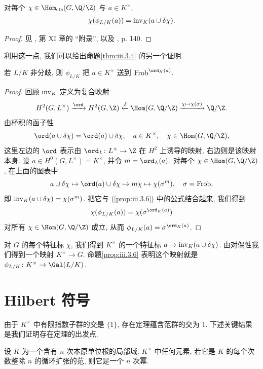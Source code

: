 \begin{proposition}\label{prop:iii.3.6}
对每个 $\chi\in\Hom_{\mathrm{cts}}(G,\Q/\Z)$ 与 $a\in K^\times$,
\[
 \chi(\phi_{L/K}(a))=\operatorname{inv}_K(a\cup\delta\chi).
\]
\end{proposition}

\begin{proof}
见 \cite{Serre1962}, 第 XI 章的 ``附录'', 以及 \cite{Serre1967a}, p. 140.
\end{proof}

利用这一点, 我们可以给出命题\ref{thm:iii.3.4} 的另一个证明.

\begin{lemma}\label{lem:iii.3.7}
若 $L/K$ 非分歧, 则 $\phi_{L/K}$ 把 $a\in K^\times$ 送到 $\Frob^{\ord_K(a)}$.
\end{lemma}

\begin{proof}
回顾 $\operatorname{inv}_K$ 定义为复合映射
\[
 H^2(G,L^\times)\xrightarrow{\ord}H^2(G,\Z)\xleftarrow{\delta}\Hom(G,\Q/\Z)\xrightarrow{\chi\mapsto\chi(\sigma)}\Q/\Z.
\]
由杯积的函子性
\[
 \ord(a\cup\delta\chi)=\ord(a)\cup\delta\chi,\quad a\in K^\times,\quad \chi\in\Hom(G,\Q/\Z),
\]
这里左边的 $\ord$ 表示由 $\ord_L\colon L^\times\to\Z$ 在 $H^2$ 上诱导的映射, 右边则是该映射本身. 设 $a\in H^0(G,L^\times)=K^\times$, 并令 $m=\ord_L(a)$. 对每个 $\chi\in\Hom(G,\Q/\Z)$, 在上面的图表中
\[
 a\cup\delta\chi\mapsto\ord(a)\cup\delta\chi\mapsto m\chi\mapsto\chi(\sigma^m),\quad \sigma=\Frob,
\]
即 $\operatorname{inv}_K(a\cup\delta\chi)=\chi(\sigma^m)$. 把它与 (\ref{prop:iii.3.6}) 中的公式结合起来, 我们得到
\[
 \chi(\phi_{L/K}(a))=\chi(\sigma^{\ord_K(a)})
\]
对所有 $\chi\in\Hom(G,\Q/\Z)$ 成立, 从而 $\phi_{L/K}(a)=\sigma^{\ord_K(a)}$.
\end{proof}

对 $G$ 的每个特征标 $\chi$, 我们得到 $K^\times$ 的一个特征标 $a\mapsto\operatorname{inv}_K(a\cup\delta\chi)$. 由对偶性我们得到一个映射 $K^\times\to G$. 命题\ref{prop:iii.3.6} 表明这个映射就是 $\phi_{L/K}\colon K^\times\to\Gal(L/K)$.

\section{Hilbert 符号}\label{sec:III.4}

由于 $K^\times$ 中有限指数子群的交是 $\{1\}$, 存在定理蕴含范群的交为 $1$. 下述关键结果是我们证明存在定理的出发点.

\begin{proposition}\label{prop:iii.4.1}
设 $K$ 为一个含有 $n$ 次本原单位根的局部域. $K^\times$ 中任何元素, 若它是 $K$ 的每个次数整除 $n$ 的循环扩张的范, 则它是一个 $n$ 次幂.
\end{proposition}

